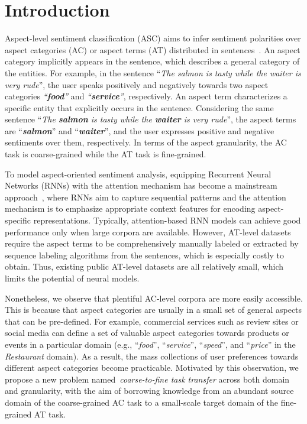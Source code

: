 \documentclass[letterpaper]{article} \usepackage{aaai19}  \usepackage{times}  \usepackage{latexsym}
\begin{document}
\section{Introduction}
Aspect-level sentiment classification (ASC) aims to infer sentiment polarities over aspect categories (AC) or aspect terms (AT) distributed in sentences~\cite{pang2008opinion,liu2012sentiment}. An aspect category implicitly appears in the sentence, which describes a general category of the entities. For example, in the sentence ``{\it The salmon is tasty while the waiter is very rude}'', the user speaks positively and negatively towards two aspect categories {\it ``{\textbf{food}}''} and {\it ``{\textbf{service}}''}, respectively. An aspect term characterizes a specific entity that explicitly occurs in the sentence. Considering the same sentence ``{\it The \textbf{salmon} is tasty while the \textbf{waiter} is very rude}'', the aspect terms are ``{\it \textbf{salmon}}'' and ``{\it \textbf{waiter}}'', and the user expresses positive and negative sentiments over them, respectively. In terms of the aspect granularity, the AC task is coarse-grained while the AT task is fine-grained.

To model aspect-oriented sentiment analysis, equipping Recurrent Neural Networks (RNNs) with the attention mechanism has become a mainstream approach~\cite{tang2015effective,wang2016attention,ma2017interactive,chen2017recurrent}, where RNNs aim to capture sequential patterns and the attention mechanism is to emphasize appropriate context features for encoding aspect-specific representations. Typically, attention-based RNN models can achieve good performance only when large corpora are available. 
However, AT-level datasets require the aspect terms to be comprehensively manually labeled or extracted by sequence labeling algorithms from the sentences, which is especially costly to obtain. Thus, existing public AT-level datasets are all relatively small, which limits the potential of neural models. 

Nonetheless, we observe that plentiful AC-level corpora are more easily accessible. This is because that aspect categories are usually in a small set of general aspects that can be pre-defined. For example, commercial services such as review sites or social media can define a set of valuable aspect categories towards products or events in a particular domain (e.g., ``{\it food}'', ``{\it service}'', ``{\it speed}'', and ``{\it price}'' in the {\it Restaurant} domain). As a result, the mass collections of user preferences towards different aspect categories become practicable. Motivated by this observation, we propose a new problem named~\emph{coarse-to-fine task transfer} across both domain and granularity, with the aim of borrowing knowledge from an abundant source domain of the coarse-grained AC task to a small-scale target domain of the fine-grained AT task.
\end{document}
